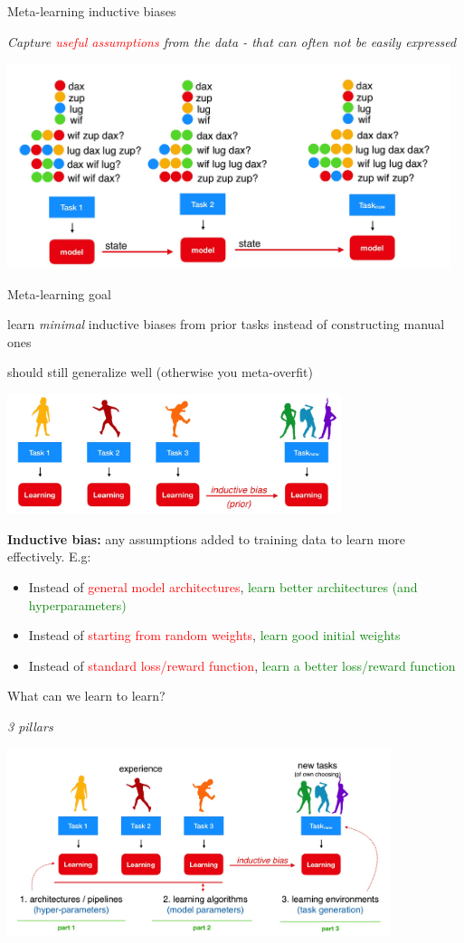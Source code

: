 \begin{frame}{Meta-learning inductive biases}
\centerline{\textit{Capture \textcolor{red}{useful assumptions} from the data - that can often not be easily expressed}}
\centering\includegraphics[height=6cm]{image/img193434.jpg}

\end{frame}

\begin{frame}{Meta-learning goal}
\centerline{learn \textit{minimal} inductive biases from prior tasks instead of constructing manual ones }
\centerline{should still generalize well (otherwise you meta-overfit)}
\centering\includegraphics[height=3.5cm]{image/img193722.jpg}


\textbf{Inductive bias:} any assumptions added to training data to learn more effectively. E.g:
\begin{itemize}
  \item Instead of \textcolor{red}{general model architectures}, \textcolor{green}{learn better architectures (and hyperparameters)}
  \item Instead of \textcolor{red}{starting from random weights}, \textcolor{green}{learn good initial weights}
  \item Instead of \textcolor{red}{standard loss/reward function}, \textcolor{green}{learn a better loss/reward function}
\end{itemize}
\end{frame}

\begin{frame}{What can we learn to learn?}
\centerline{\textit{3 pillars}}
\centering\includegraphics[height=5.5cm]{image/img194451.jpg}
\end{frame}


